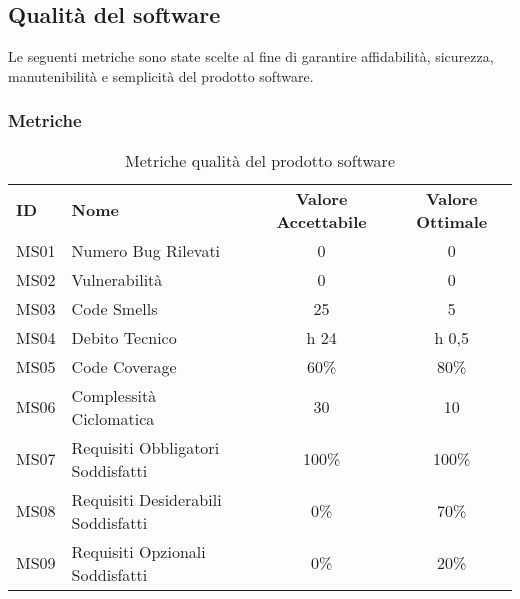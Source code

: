 \subsection{Qualità del software}
Le seguenti metriche sono state scelte al fine di garantire affidabilità, sicurezza, manutenibilità e semplicità del prodotto software.

    \subsubsection{Metriche}
    \begin{table} [h!]
        \begin{center}
            \begin{tabular} {m{2 cm} m{7 cm} c c }
                \rowcolor{lightgray}
                \textbf{ID} & \textbf{Nome}           & \textbf{Valore Accettabile} & \textbf{Valore Ottimale}\\
                MS01        & Numero Bug Rilevati     & 0                           & 0\\
                MS02        & Vulnerabilità           & 0                           & 0\\
                MS03        & Code Smells             & 25                          & 5\\
                MS04        & Debito Tecnico          & h 24                        & h 0,5\\
                MS05        & Code Coverage           & 60\%                        & 80\%\\
                MS06        & Complessità Ciclomatica & 30                          & 10\\
                MS07        & Requisiti Obbligatori Soddisfatti & 100\%             & 100\%\\
                MS08        & Requisiti Desiderabili Soddisfatti & 0\%              & 70\%\\
                MS09        & Requisiti Opzionali Soddisfatti & 0\%                 & 20\%\\
            \end{tabular}
            \caption{Metriche qualità del prodotto software}
        \end{center}
    \end{table}